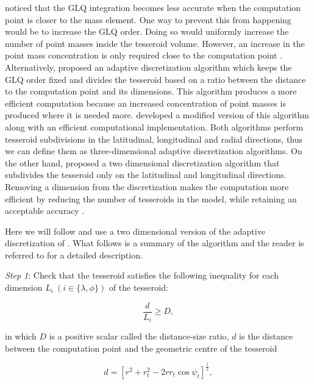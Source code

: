 \documentclass[extra, referee]{gji}
\begin{document}
\citet{Ku1977} noticed that the GLQ integration
becomes less accurate when the computation point is closer to the
mass element.
One way to prevent this from happening would be to increase the GLQ order.
Doing so would uniformly increase the number of point masses inside the
tesseroid volume.
However, an increase in the point mass concentration is only required close to the
computation point \citep{Uieda2016}.
Alternatively, \citet{Li2011} proposed an adaptive
discretization algorithm which keeps the GLQ order fixed and divides the
tesseroid based on a ratio between the distance to the computation
point and its dimensions.
This algorithm produces a more efficient computation because an increased concentration
of point masses is produced where it is needed more.
\citet{Uieda2016} developed a modified version of this algorithm along with an efficient
computational implementation.
Both algorithms perform tesseroid subdivisions in the latitudinal,
longitudinal and radial directions, thus we can define them as three-dimensional
adaptive discretization algorithms.
On the other hand, \citet{Lin2018} proposed a two dimensional discretization algorithm
that subdivides the tesseroid only on the latitudinal and longitudinal directions.
Removing a dimension from the discretization makes the computation more efficient by
reducing the number of tesseroids in the model, while
retaining an acceptable accuracy \citep{Lin2018}.

Here we will follow \citet{Lin2018} and use a two dimensional version of the adaptive
discretization of \citet{Uieda2016}.
What follows is a summary of the algorithm and the reader is referred to
\citet{Uieda2016} for a detailed description.

\textit{Step 1}: Check that the tesseroid satisfies the following inequality for each
dimension $L_i\ (i \in \{\lambda, \phi\})$ of the tesseroid:

\begin{equation}
    \frac{d}{L_i} \geq D,
    \label{eq:condition}
\end{equation}

\noindent
in which $D$ is a positive scalar called the distance-size ratio, $d$ is the distance
between the computation point and the geometric centre of the tesseroid

\begin{equation}
    d = \left[
        r^2 + r_t^2 - 2 r r_t \cos\psi_t
        \right]^{\frac{1}{2}} ,
    \label{eq:distance}
\end{equation}
\end{document}
